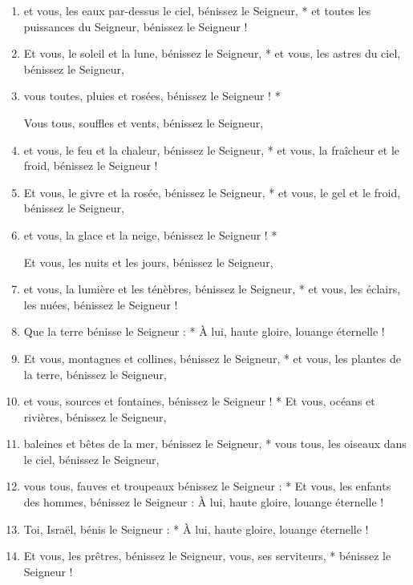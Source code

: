 \documentclass[twoside]{article}
\begin{document}
\begin{paracol}[1]{2}
\begin{enumerate}[wide, itemsep=0mm, labelwidth=!, labelindent=0pt, label=\color{gregoriocolor}\theenumi]
\item et vous, les eaux par-dessus le ciel,
   bénissez le Seigneur, *
    et toutes les puissances du Seigneur,
   bénissez le Seigneur !

\item Et vous, le soleil et la lune,
   bénissez le Seigneur, *
et vous, les astres du ciel, 
   bénissez le Seigneur,
\item vous toutes, pluies et rosées,
   bénissez le Seigneur ! *

 Vous tous, souffles et vents,
   bénissez le Seigneur,
\item et vous, le feu et la chaleur,
   bénissez le Seigneur, *
et vous, la fraîcheur et le froid,
   bénissez le Seigneur !

\item Et vous, le givre et la rosée,
   bénissez le Seigneur, *
et vous, le gel et le froid,
   bénissez le Seigneur,
\item et vous, la glace et la neige,
   bénissez le Seigneur ! *

Et vous, les nuits et les jours,
   bénissez le Seigneur,
\item et vous, la lumière et les ténèbres,
   bénissez le Seigneur, *
et vous, les éclairs, les nuées,
   bénissez le Seigneur !

\item Que la terre bénisse le Seigneur : *
À lui, haute gloire, louange éternelle !

\item Et vous, montagnes et collines,
   bénissez le Seigneur, *
et vous, les plantes de la terre,
   bénissez le Seigneur,
   
\item et vous, sources et fontaines,
   bénissez le Seigneur ! *
 Et vous, océans et rivières,
   bénissez le Seigneur,
   
\item baleines et bêtes de la mer,
   bénissez le Seigneur, *
vous tous, les oiseaux dans le ciel,
   bénissez le Seigneur,
   
\item vous tous, fauves et troupeaux
   bénissez le Seigneur : *
Et vous, les enfants des hommes,
   bénissez le Seigneur :
À lui, haute gloire, louange éternelle !

\item Toi, Israël,
   bénis le Seigneur : *
À lui, haute gloire, louange éternelle !

\item Et vous, les prêtres,
   bénissez le Seigneur,
vous, ses serviteurs, *
   bénissez le Seigneur !


\end{enumerate}
\end{paracol}
\end{document}
